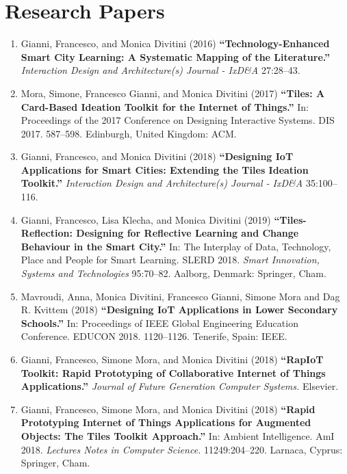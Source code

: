 \chapter*{Research Papers}
\begin{small}
\begin{enumerate}[label=\numberingI{\textbf{P\arabic*}}]
    \item Gianni, Francesco, and Monica Divitini (2016) \textbf{\enquote{Technology-Enhanced Smart City Learning: A Systematic Mapping of the Literature.}} \emph{Interaction Design and Architecture(s) Journal - IxD\&A} 27:28--43.
    
    \item Mora, Simone, Francesco Gianni, and Monica Divitini (2017) \textbf{\enquote{Tiles: A Card-Based Ideation Toolkit for the Internet of Things.}} In: Proceedings of the 2017 Conference on Designing Interactive Systems. DIS 2017. 587--598. Edinburgh, United Kingdom: ACM.
    
    \item Gianni, Francesco, and Monica Divitini (2018) \textbf{\enquote{Designing IoT Applications for Smart Cities: Extending the Tiles Ideation Toolkit.}} \emph{Interaction Design and Architecture(s) Journal - IxD\&A} 35:100--116.
    
    \item Gianni, Francesco, Lisa Klecha, and Monica Divitini (2019) \textbf{\enquote{Tiles-Reflection: Designing for Reflective Learning and Change Behaviour in the Smart City.}} In: The Interplay of Data, Technology, Place and People for Smart Learning. SLERD 2018. \emph{Smart Innovation, Systems and Technologies} 95:70--82. Aalborg, Denmark: Springer, Cham.
   
    \item Mavroudi, Anna, Monica Divitini, Francesco Gianni, Simone Mora and Dag R. Kvittem (2018) \textbf{\enquote{Designing IoT Applications in Lower Secondary Schools.}} In: Proceedings of IEEE Global Engineering Education Conference. EDUCON 2018. 1120--1126. Tenerife, Spain: IEEE.
    
    \item Gianni, Francesco, Simone Mora, and Monica Divitini (2018) \textbf{\enquote{RapIoT Toolkit: Rapid Prototyping of Collaborative Internet of Things Applications.}} \emph{Journal of Future Generation Computer Systems.} Elsevier.
    
    \item Gianni, Francesco, Simone Mora, and Monica Divitini (2018) \textbf{\enquote{Rapid Prototyping Internet of Things Applications for Augmented Objects: The Tiles Toolkit Approach.}} In: Ambient Intelligence. AmI 2018. \emph{Lectures Notes in Computer Science.} 11249:204--220. Larnaca, Cyprus: Springer, Cham.
\end{enumerate}
\end{small}

